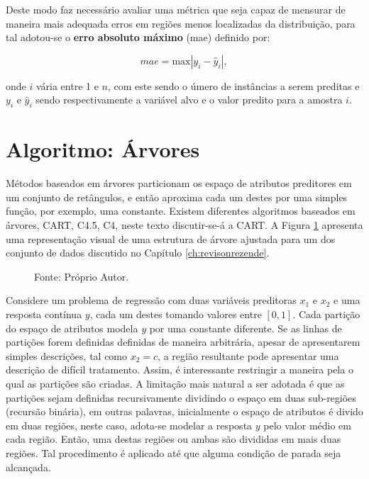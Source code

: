 
Deste modo faz necessário avaliar uma métrica que seja capaz de mensurar de maneira mais adequada erros em regiões menos localizadas da distribuição, para tal adotou-se o {\bf erro absoluto máximo} (mae) definido por:

\begin{equation}
mae=\mbox{max}|y_{i}-\hat{y}_i|\mbox{,}~
\end{equation}

onde $i$ vária entre 1 e $n$, com este sendo o úmero de instâncias a serem preditas e $y_i$ e $\hat{y}_i$ sendo respectivamente a variável alvo e o valor predito para a amostra $i$.

\section{Algoritmo: Árvores}

Métodos baseados em árvores particionam os espaço de atributos preditores em um conjunto de retângulos, e então aproxima cada um destes por uma simples função, por exemplo, uma constante. Existem diferentes algoritmos baseados em árvores, CART, C4.5, C4, neste texto discutir-se-á a CART. A Figura \ref{fig:tree} apresenta uma representação visual de uma estrutura de árvore ajustada para um dos conjunto de dados discutido no Capítulo \ref{ch:revisonrezende}.

\begin{figure}[H]
\centering
{}
\caption{Fonte: Próprio Autor.}
\label{fig:tree}
\end{figure}


Considere um problema de regressão com duas variáveis preditoras $x_1$ e $x_2$ e uma resposta contínua $y$, cada um destes tomando valores entre $[0,1]$. Cada partição do espaço de atributos modela $y$ por uma constante diferente. Se as linhas de partições forem definidas definidas de maneira arbitrária, apesar de apresentarem simples descrições, tal como $x_2=c$, a região resultante pode apresentar uma descrição de difícil tratamento. Assim, é interessante restringir a maneira pela o qual as partições são criadas. A limitação mais natural a ser adotada é que as partições sejam definidas recursivamente dividindo o espaço em duas sub-regiões (recursão binária), em outras palavras, inicialmente o espaço de atributos é divido em duas regiões, neste caso, adota-se modelar a resposta $y$ pelo valor médio em cada região. Então, uma destas regiões ou ambas são divididas em mais duas regiões. Tal procedimento é aplicado até que alguma condição de parada seja alcançada. 

